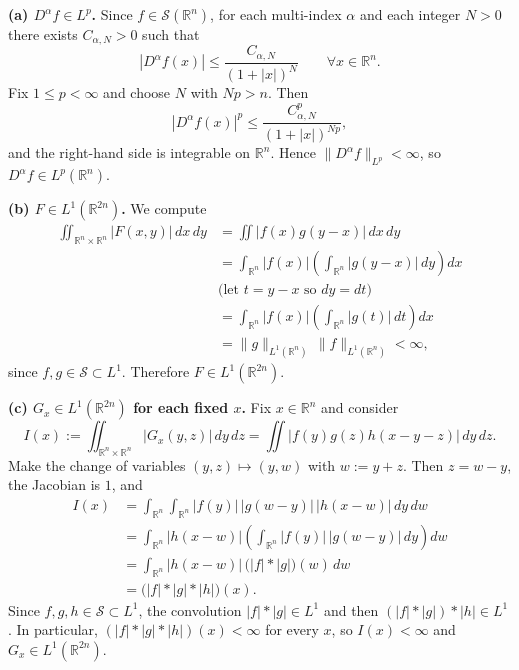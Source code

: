 \begin{solution}
\par\medskip\noindent\textbf{(a) $D^\alpha f\in L^p$.}\quad
Since $f\in\mathcal{S}(\mathbb{R}^n)$, for each multi-index $\alpha$ and
each integer $N>0$ there exists $C_{\alpha,N}>0$ such that
\[
|D^\alpha f(x)|
\le \frac{C_{\alpha,N}}{(1+|x|)^N}
\qquad \forall x\in\mathbb{R}^n.
\]
Fix $1\le p<\infty$ and choose $N$ with $Np>n$. Then
\[
|D^\alpha f(x)|^p \le \frac{C_{\alpha,N}^p}{(1+|x|)^{Np}},
\]
and the right-hand side is integrable on $\mathbb{R}^n$. Hence
$\|D^\alpha f\|_{L^p}<\infty$, so $D^\alpha f\in L^p(\mathbb{R}^n)$.

\par\medskip\noindent\textbf{(b) $F\in L^1(\mathbb{R}^{2n})$.}\quad
We compute
\[
\begin{aligned}
	\iint_{\mathbb{R}^n\times\mathbb{R}^n}
	|F(x,y)|\,dx\,dy
	&= \iint |f(x)g(y-x)|\,dx\,dy \\
	&= \int_{\mathbb{R}^n} |f(x)|
	\left( \int_{\mathbb{R}^n} |g(y-x)|\,dy \right) dx \\
	&\text{(let $t=y-x$ so $dy=dt$)}\\
	&= \int_{\mathbb{R}^n} |f(x)|
	\left( \int_{\mathbb{R}^n} |g(t)|\,dt \right) dx \\
	&= \|g\|_{L^1(\mathbb{R}^n)} \,
	\|f\|_{L^1(\mathbb{R}^n)} < \infty,
\end{aligned}
\]
since $f,g\in\mathcal{S}\subset L^1$. Therefore $F\in L^1(\mathbb{R}^{2n})$.

\par\medskip\noindent\textbf{(c) $G_x\in L^1(\mathbb{R}^{2n})$ for each fixed $x$.}\quad
Fix $x\in\mathbb{R}^n$ and consider
\[
I(x) := \iint_{\mathbb{R}^n\times\mathbb{R}^n}
|G_x(y,z)|\,dy\,dz
= \iint |f(y)g(z)h(x-y-z)|\,dy\,dz.
\]
Make the change of variables $(y,z)\mapsto (y,w)$ with $w:=y+z$.
Then $z=w-y$, the Jacobian is $1$, and
\[
\begin{aligned}
	I(x)
	&= \int_{\mathbb{R}^n}\int_{\mathbb{R}^n}
	|f(y)|\,|g(w-y)|\,|h(x-w)|\,dy\,dw \\
	&= \int_{\mathbb{R}^n}
	|h(x-w)|
	\left( \int_{\mathbb{R}^n} |f(y)|\,|g(w-y)|\,dy \right) dw \\
	&= \int_{\mathbb{R}^n}
	|h(x-w)|\,\bigl(|f|*|g|\bigr)(w)\,dw \\
	&= \bigl(|f|*|g|*|h|\bigr)(x).
\end{aligned}
\]
Since $f,g,h\in\mathcal{S}\subset L^1$, the convolution
$|f|*|g|\in L^1$ and then $(|f|*|g|)*|h|\in L^1$. In particular,
$(|f|*|g|*|h|)(x)<\infty$ for every $x$, so $I(x)<\infty$ and
$G_x\in L^1(\mathbb{R}^{2n})$.
\end{solution}

